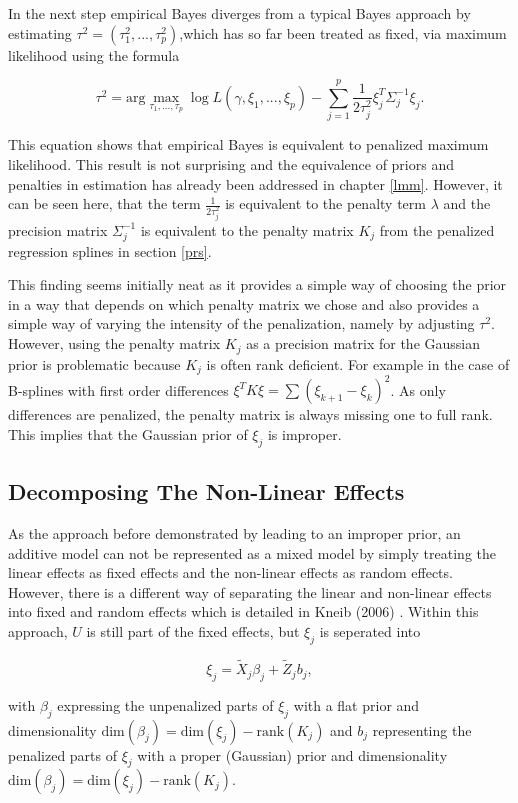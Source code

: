 \documentclass[12pt]{article}
\begin{document}
In the next step empirical Bayes diverges from a typical Bayes approach by estimating $\tau^2 = (\tau^2_1,..., \tau^2_p)$,which has so far been treated as fixed, via maximum likelihood using the formula

$$\tau^2 = \text{arg}\max_{\tau_1, ..., \tau_p} \log L(\gamma, \xi_1,...,\xi_p) - \sum_{j=1}^p \frac{1}{2\tau^2_j} \xi_j^T \Sigma^{-1}_j \xi_j.$$

This equation shows that empirical Bayes is equivalent to penalized maximum likelihood. This result is not surprising and the equivalence of priors and penalties in estimation has already been addressed in chapter \ref{lmm}. However, it can be seen here, that the term $\frac{1}{2\tau^2_j}$ is equivalent to the penalty term $\lambda$ and the precision matrix $\Sigma^{-1}_j$ is equivalent to the penalty matrix $K_j$ from the penalized regression splines in section \ref{prs}. 

This finding seems initially neat as it provides a simple way of choosing the prior in a way that depends on which penalty matrix we chose and also provides a simple way of varying the intensity of the penalization, namely by adjusting $\tau^2$. However, using the penalty matrix $K_j$ as a precision matrix for the Gaussian prior is problematic because $K_j$ is often rank deficient. For example in the case of B-splines with first order differences $\xi^TK\xi = \sum(\xi_{k+1} - \xi_{k})^2$. As only differences are penalized, the penalty matrix is always missing one to full rank. This implies that the Gaussian prior of $\xi_j$ is improper.

\subsection{Decomposing The Non-Linear Effects}

As the approach before demonstrated by leading to an improper prior, an additive model can not be represented as a mixed model by simply treating the linear effects as fixed effects and the non-linear effects as random effects. However, there is a different way of separating the linear and non-linear effects into fixed and random effects which is detailed in Kneib (2006) \cite{kneib2006mixed}. Within this approach, $U$ is still part of the fixed effects, but $\xi_j$ is seperated into 

$$\xi_j = \tilde{X}_j \beta_j + \tilde{Z}_j b_j,\label{decomp}$$

with $\beta_j$ expressing the unpenalized parts of $\xi_j$ with a flat prior and dimensionality 
$\text{dim}(\beta_j) = \text{dim}(\xi_j) {-} \text{rank}(K_j)$ and $b_j$ representing the penalized parts of $\xi_j$ with a proper (Gaussian) prior and dimensionality $\text{dim}(\beta_j) = \text{dim}(\xi_j) {-} \text{rank}(K_j)$.
\end{document}

